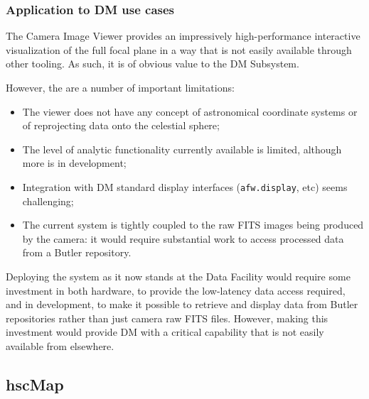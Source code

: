 \subsubsection{Application to DM use cases}

The Camera Image Viewer provides an impressively high-performance interactive visualization of the full focal plane in a way that is not easily available through other tooling.
As such, it is of obvious value to the DM Subsystem.

However, the are a number of important limitations:

\begin{itemize}

  \item{The viewer does not have any concept of astronomical coordinate systems or of reprojecting data onto the celestial sphere;}
  \item{The level of analytic functionality currently available is limited, although more is in development;}
  \item{Integration with DM standard display interfaces (\texttt{afw.display}, etc) seems challenging;}
  \item{The current system is tightly coupled to the raw FITS images being produced by the camera: it would require substantial work to access processed data from a Butler repository.}

\end{itemize}

Deploying the system as it now stands at the Data Facility would require some investment in both hardware, to provide the low-latency data access required, and in development, to make it possible to retrieve and display data from Butler repositories rather than just camera raw FITS files.
However, making this investment would provide DM with a critical capability that is not easily available from elsewhere.



\subsection{hscMap}
\label{sec:existing_tools:hscMap}

